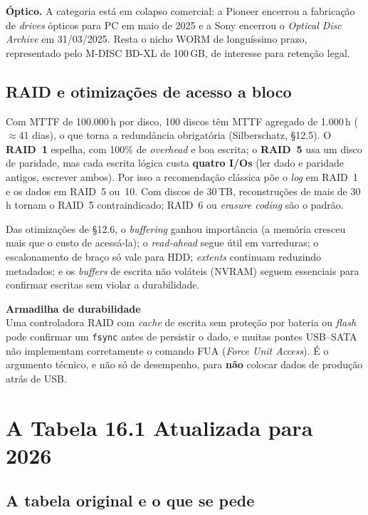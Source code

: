 \documentclass[11pt,a4paper]{article}
\newcommand{\correcao}[2]{%
  \begin{center}\begin{minipage}{0.97\textwidth}
  \colorbox{fundo}{\begin{minipage}{\dimexpr\linewidth-2\fboxsep}
  \vspace{3pt}\textbf{\color{laranja}#1}\\[2pt]\small #2\vspace{3pt}
  \end{minipage}}\end{minipage}\end{center}}
\begin{document}
\textbf{Óptico.} A categoria está em colapso comercial: a Pioneer encerrou a fabricação de
\emph{drives} ópticos para PC em maio de 2025 e a Sony encerrou o \emph{Optical Disc Archive}
em 31/03/2025. Resta o nicho WORM de longuíssimo prazo, representado pelo M-DISC BD-XL de
100\,GB, de interesse para retenção legal.

\subsection{RAID e otimizações de acesso a bloco}

Com MTTF de 100.000\,h por disco, 100 discos têm MTTF agregado de 1.000\,h ($\approx$41 dias),
o que torna a redundância obrigatória (Silberschatz, §12.5). O \textbf{RAID~1} espelha, com
100\% de \emph{overhead} e boa escrita; o \textbf{RAID~5} usa um disco de paridade, mas cada
escrita lógica custa \textbf{quatro I/Os} (ler dado e paridade antigos, escrever ambos).
Por isso a recomendação clássica põe o \emph{log} em RAID~1 e os dados em RAID~5 ou~10. Com
discos de 30\,TB, reconstruções de mais de 30\,h tornam o RAID~5 contraindicado; RAID~6 ou
\emph{erasure coding} são o padrão.

Das otimizações de §12.6, o \emph{buffering} ganhou importância (a memória cresceu mais que o
custo de acessá-la); o \emph{read-ahead} segue útil em varreduras; o escalonamento de braço
só vale para HDD; \emph{extents} continuam reduzindo metadados; e os \emph{buffers} de escrita
não voláteis (NVRAM) seguem essenciais para confirmar escritas sem violar a durabilidade.

\correcao{Armadilha de durabilidade}{%
Uma controladora RAID com \emph{cache} de escrita sem proteção por bateria ou \emph{flash}
pode confirmar um \texttt{fsync} antes de persistir o dado, e muitas pontes USB--SATA não
implementam corretamente o comando FUA (\emph{Force Unit Access}). É o argumento técnico, e
não só de desempenho, para \textbf{não} colocar dados de produção atrás de USB.}

\section{A Tabela 16.1 Atualizada para 2026}

\subsection{A tabela original e o que se pede}
\end{document}
